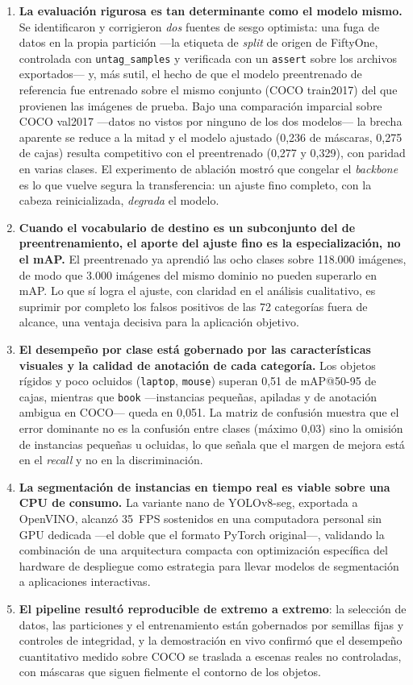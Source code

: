 \documentclass[11pt,a4paper]{article}
\begin{document}
\begin{enumerate}
  \item \textbf{La evaluación rigurosa es tan determinante como el modelo
  mismo.} Se identificaron y corrigieron \emph{dos} fuentes de sesgo optimista:
  una fuga de datos en la propia partición ---la etiqueta de \emph{split} de
  origen de FiftyOne, controlada con \texttt{untag\_samples} y verificada con un
  \texttt{assert} sobre los archivos exportados--- y, más sutil, el hecho de que
  el modelo preentrenado de referencia fue entrenado sobre el mismo conjunto
  (COCO train2017) del que provienen las imágenes de prueba. Bajo una
  comparación imparcial sobre COCO val2017 ---datos no vistos por ninguno de los
  dos modelos--- la brecha aparente se reduce a la mitad y el modelo ajustado
  (0,236 de máscaras, 0,275 de cajas) resulta competitivo con el preentrenado
  (0,277 y 0,329), con paridad en varias clases. El experimento de ablación
  mostró que congelar el \emph{backbone} es lo que vuelve segura la
  transferencia: un ajuste fino completo, con la cabeza reinicializada,
  \emph{degrada} el modelo.
  \item \textbf{Cuando el vocabulario de destino es un subconjunto del de
  preentrenamiento, el aporte del ajuste fino es la especialización, no el
  mAP.} El preentrenado ya aprendió las ocho clases sobre 118.000 imágenes, de
  modo que 3.000 imágenes del mismo dominio no pueden superarlo en mAP. Lo que
  sí logra el ajuste, con claridad en el análisis cualitativo, es suprimir por
  completo los falsos positivos de las 72 categorías fuera de alcance, una
  ventaja decisiva para la aplicación objetivo.
  \item \textbf{El desempeño por clase está gobernado por las características
  visuales y la calidad de anotación de cada categoría.} Los objetos rígidos y
  poco ocluidos (\texttt{laptop}, \texttt{mouse}) superan 0,51 de mAP@50-95 de
  cajas, mientras que \texttt{book} ---instancias pequeñas, apiladas y de
  anotación ambigua en COCO--- queda en 0,051. La matriz de confusión muestra
  que el error dominante no es la confusión entre clases (máximo 0,03) sino la
  omisión de instancias pequeñas u ocluidas, lo que señala que el margen de
  mejora está en el \emph{recall} y no en la discriminación.
  \item \textbf{La segmentación de instancias en tiempo real es viable sobre
  una CPU de consumo.} La variante nano de YOLOv8-seg, exportada a OpenVINO,
  alcanzó 35~FPS sostenidos en una computadora personal sin GPU dedicada
  ---el doble que el formato PyTorch original---, validando la combinación de
  una arquitectura compacta con optimización específica del hardware de
  despliegue como estrategia para llevar modelos de segmentación a
  aplicaciones interactivas.
  \item \textbf{El pipeline resultó reproducible de extremo a extremo}: la
  selección de datos, las particiones y el entrenamiento están gobernados por
  semillas fijas y controles de integridad, y la demostración en vivo confirmó
  que el desempeño cuantitativo medido sobre COCO se traslada a escenas reales
  no controladas, con máscaras que siguen fielmente el contorno de los objetos.
\end{enumerate}
\end{document}
